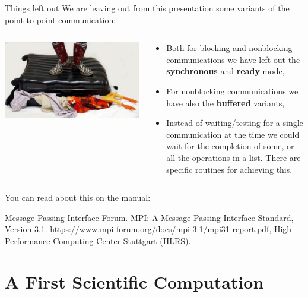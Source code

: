 \documentclass[xcolor={svgnames,usenames}]{beamer}
\begin{document}
\begin{frame}{Things left out}
	We are leaving out from this presentation some variants of the point-to-point communication:
	\begin{columns}
		\begin{column}{0.4\columnwidth}
		\centering
		\includegraphics[width=\columnwidth]{fullsuitcase.jpg}
		\end{column}
		\begin{column}{0.6\columnwidth}
		\begin{itemize}
			\item Both for blocking and nonblocking communications we have left out the \textbf{synchronous} and \textbf{ready} mode,
			\item For nonblocking communications we have also the \textbf{buffered} variants,
			\item Instead of waiting/testing for a single communication at the time we could wait for the completion of some, or all the operations
			in a list. There are specific routines for achieving this.
		\end{itemize}
		\end{column}

	\end{columns}
	\vfill
	You can read about this on the manual:
\begin{thebibliography}{10}
	  \footnotesize Message Passing Interface Forum. MPI: A Message-Passing Interface Standard, Version 3.1. \url{https://www.mpi-forum.org/docs/mpi-3.1/mpi31-report.pdf}, High Performance Computing Center Stuttgart (HLRS).
\end{thebibliography}


\end{frame}

\section{A First Scientific Computation}
\end{document}
